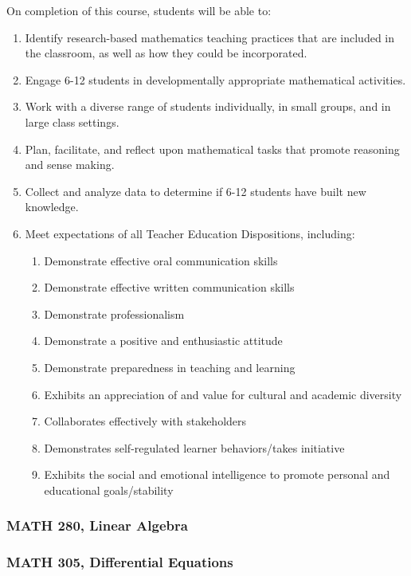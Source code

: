 \documentclass[11pt]{article}
\newenvironment{alphalist}{
\begin{enumerate}[label=(\arabic*),widest=107 ,leftmargin=25pt, itemsep=0pt]}
{\end{enumerate}}
\newenvironment{betalist}{
\begin{enumerate}[label=(\alph*),widest=zzz,leftmargin=35pt,itemsep=0pt]}
{\end{enumerate}}
\begin{document}
On completion of this course, students will be able to:
\begin{alphalist}
\item Identify research-based mathematics teaching practices that are included in the classroom, as well as how they could be incorporated.
\item Engage 6-12 students in developmentally appropriate mathematical activities. 
\item Work with a diverse range of students individually, in small groups, and in large class settings.
\item Plan, facilitate, and reflect upon mathematical tasks that promote reasoning and sense making.
\item Collect and analyze data to determine if 6-12 students have built new knowledge.
\item Meet expectations of all Teacher Education Dispositions, including:
\begin{betalist}
    \item Demonstrate effective oral communication skills
    \item Demonstrate effective written communication skills
    \item Demonstrate professionalism
    \item Demonstrate a positive and enthusiastic attitude
    \item Demonstrate preparedness in teaching and learning
    \item Exhibits an appreciation of and value for cultural and academic diversity
    \item Collaborates effectively with stakeholders
    \item Demonstrates self-regulated learner behaviors/takes initiative
    \item Exhibits the social and emotional intelligence to promote personal and educational goals/stability
\end{betalist}
\end{alphalist}

\subsubsection*{MATH 280, Linear Algebra}



\subsubsection*{MATH 305, Differential Equations}
\end{document}

